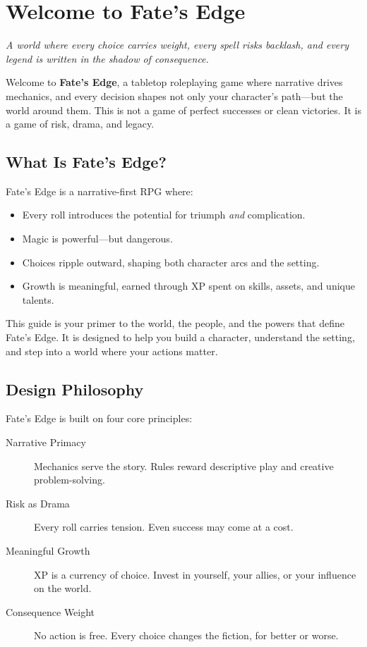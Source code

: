 
\chapter{Welcome to Fate’s Edge}

\emph{A world where every choice carries weight, every spell risks backlash, and every legend is written in the shadow of consequence.}

Welcome to \textbf{Fate’s Edge}, a tabletop roleplaying game where narrative drives mechanics, and every decision shapes not only your character’s path—but the world around them. This is not a game of perfect successes or clean victories. It is a game of risk, drama, and legacy.

\section*{What Is Fate’s Edge?}

Fate’s Edge is a narrative-first RPG where:
\begin{itemize}
  \item Every roll introduces the potential for triumph \emph{and} complication.
  \item Magic is powerful—but dangerous.
  \item Choices ripple outward, shaping both character arcs and the setting.
  \item Growth is meaningful, earned through XP spent on skills, assets, and unique talents.
\end{itemize}

This guide is your primer to the world, the people, and the powers that define Fate’s Edge. It is designed to help you build a character, understand the setting, and step into a world where your actions matter.

\section*{Design Philosophy}

Fate’s Edge is built on four core principles:

\begin{description}
  \item[Narrative Primacy] Mechanics serve the story. Rules reward descriptive play and creative problem-solving.
  \item[Risk as Drama] Every roll carries tension. Even success may come at a cost.
  \item[Meaningful Growth] XP is a currency of choice. Invest in yourself, your allies, or your influence on the world.
  \item[Consequence Weight] No action is free. Every choice changes the fiction, for better or worse.
\end{description}

